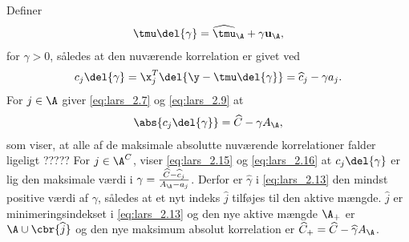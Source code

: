 %
Definer
\begin{align}
\tmu \del{\gamma} = \widehat{\tmu}_\A + \gamma \mathbf{u}_\A, \label{eq:lars_2.14}
\end{align}
for \(\gamma > 0\), således at den nuværende korrelation er givet ved
\begin{align}
c_j \del{\gamma} = \x_j^T \del{\y - \tmu \del{\gamma}} = \widehat{c}_j - \gamma a_j. \label{eq:lars_2.15}
\end{align}
For \(j \in \A\) giver \eqref{eq:lars_2.7} og \eqref{eq:lars_2.9} at
\begin{align}
\abs{c_j \del{\gamma}} = \widehat{C} - \gamma A_\A,\label{eq:lars_2.16}
\end{align}
som viser, at alle af de maksimale absolutte nuværende korrelationer falder ligeligt ?????
For \(j \in \A^C\), viser \eqref{eq:lars_2.15} og \eqref{eq:lars_2.16} at \(c_j \del{\gamma}\) er lig den maksimale værdi i \(\gamma = \frac{\widehat{C} - \widehat{c}_j}{A_\A - a_j}\).
Derfor er \(\widehat{\gamma}\) i \eqref{eq:lars_2.13} den mindst positive værdi af \(\gamma\), således at et nyt indeks \(\widehat{j}\) tilføjes til den aktive mængde.
\(\widehat{j}\) er minimeringsindekset i \eqref{eq:lars_2.13} og den nye aktive mængde \(\A_+\) er \(\A \cup \cbr{\widehat{j}}\) og den nye maksimum absolut korrelation er \(\widehat{C}_+ = \widehat{C}- \widehat{\gamma} A_\A\).

